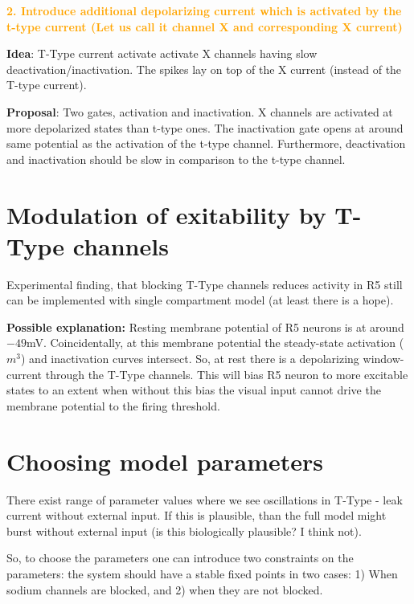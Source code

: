 \documentclass[11pt]{article}
\begin{document}
\textcolor{orange}{
    \textbf{2. Introduce additional depolarizing current which is activated by the t-type current
(Let us call it channel X and corresponding X current)}
}

\textbf{Idea}: T-Type current activate activate X channels having slow deactivation/inactivation.
The spikes lay on top of the X current (instead of the T-type current).

\textbf{Proposal}: Two gates, activation and inactivation. X channels
are activated at more depolarized states than t-type ones. The inactivation gate
opens at around same potential as the activation of the t-type channel. Furthermore,
deactivation and inactivation should be slow in comparison to the t-type channel.


\color{orange}
\section{Modulation of exitability by T-Type channels}
\color{black}

Experimental finding, that blocking T-Type channels reduces activity in R5 still can be
implemented with single compartment model (at least there is a hope).

\textbf{Possible explanation:} Resting membrane potential of R5 neurons is at around
$-49$mV. Coincidentally, at this membrane potential the steady-state activation ($m^3$)
and inactivation curves intersect. So, at rest there is a depolarizing window-current
through the T-Type channels. This will bias R5 neuron to more excitable states to an extent
when without this bias the visual input cannot drive the membrane potential to the
firing threshold.

\section{Choosing model parameters}

There exist range of parameter values where we see oscillations in T-Type - leak
current without external input. If this is plausible, than the full model might
burst without external input (is this biologically plausible? I think not).

So, to choose the parameters one can introduce two constraints on the parameters:
the system should have a stable fixed points in two cases: 1) When sodium channels
are blocked, and 2) when they are not blocked.

\printbibliography
\end{document}
